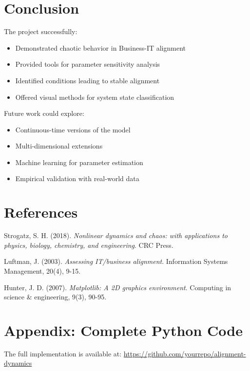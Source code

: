 \documentclass[a4paper, 12pt]{article}
\begin{document}
\section{Conclusion}
The project successfully:
\begin{itemize}
	\item Demonstrated chaotic behavior in Business-IT alignment
	\item Provided tools for parameter sensitivity analysis
	\item Identified conditions leading to stable alignment
	\item Offered visual methods for system state classification
\end{itemize}

Future work could explore:
\begin{itemize}
	\item Continuous-time versions of the model
	\item Multi-dimensional extensions
	\item Machine learning for parameter estimation
	\item Empirical validation with real-world data
\end{itemize}

\section*{References}
\begin{thebibliography}{9}
	Strogatz, S. H. (2018). \textit{Nonlinear dynamics and chaos: with applications to physics, biology, chemistry, and engineering}. CRC Press.

	Luftman, J. (2003). \textit{Assessing IT/business alignment}. Information Systems Management, 20(4), 9-15.

	Hunter, J. D. (2007). \textit{Matplotlib: A 2D graphics environment}. Computing in science \& engineering, 9(3), 90-95.
\end{thebibliography}

\appendix
\section{Appendix: Complete Python Code}
The full implementation is available at: \url{https://github.com/yourrepo/alignment-dynamics}
\end{document}
